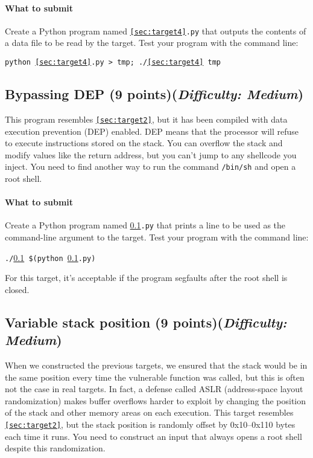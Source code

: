 \documentclass[letterpaper,12pt]{report}
\begin{document}
{\paragraph{What to submit}
Create a Python program named \texttt{\ref{sec:target4}.py} that outputs the contents of a data file to be read by the target.  Test your program with the command line:

\smallskip

\quad\texttt{python \ref{sec:target4}.py > tmp; ./\ref{sec:target4} tmp}

\subsection{Bypassing DEP (9 points)\hfill\rm\normalsize (\emph{Difficulty: Medium})}
\label{sec:target5}

This program resembles \texttt{\ref{sec:target2}}, but it has been compiled with data execution prevention (DEP) enabled.  DEP means that the processor will refuse to execute instructions stored on the stack.  You can overflow the stack and modify values like the return address, but you can't jump to any shellcode you inject.  You need to find another way to run the command \texttt{/bin/sh} and open a root shell.

\paragraph{What to submit}
Create a Python program named \texttt{\ref{sec:target5}.py} that prints a line to be used as the command-line argument to the target.  Test your program with the command line:

\smallskip

\quad\texttt{./\ref{sec:target5} \$(python \ref{sec:target5}.py)}

\medskip

For this target, it's acceptable if the program segfaults after the root shell is closed.

\subsection{Variable stack position (9 points)\hfill\rm\normalsize (\emph{Difficulty: Medium})}
\label{sec:target6}

When we constructed the previous targets, we ensured that the stack would be in the same position every time the vulnerable function was called, but this is often not the case in real targets.  In fact, a defense called ASLR (address-space layout randomization) makes buffer overflows harder to exploit by changing the position of the stack and other memory areas on each execution.  This target resembles \texttt{\ref{sec:target2}}, but the stack position is randomly offset by 0x10--0x110 bytes each time it runs.  You need to construct an input that always opens a root shell despite this randomization.

}
\end{document}
